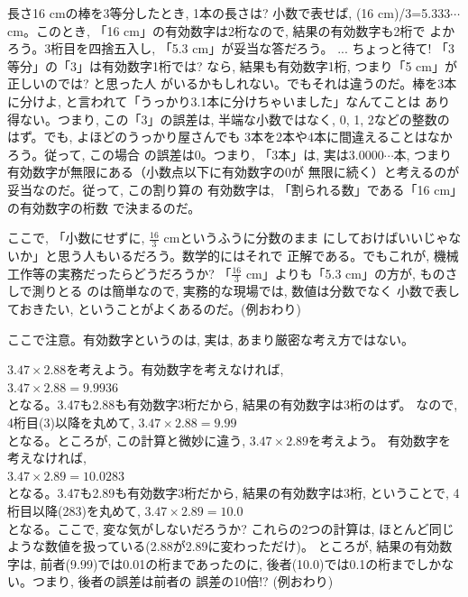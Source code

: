 \begin{exmpl} 長さ16 cmの棒を3等分したとき, 1本の長さは? 
小数で表せば, (16 cm)/3=5.333$\cdots$ cm。このとき, 
「16 cm」の有効数字は2桁なので, 結果の有効数字も2桁で
よかろう。3桁目を四捨五入し, 「5.3 cm」が妥当な答だろう。
 ... ちょっと待て! 「3等分」の「3」は有効数字1桁では? なら, 
結果も有効数字1桁, つまり「5 cm」が正しいのでは? と思った人
がいるかもしれない。でもそれは違うのだ。棒を3本に分けよ, 
と言われて「うっかり3.1本に分けちゃいました」なんてことは
あり得ない。つまり, この「3」の誤差は, 半端な小数ではなく, 
0, 1, 2などの整数のはず。でも, よほどのうっかり屋さんでも
3本を2本や4本に間違えることはなかろう。従って, この場合
の誤差は0。つまり, 「3本」は, 実は3.0000$\cdots$本, 
つまり有効数字が無限にある（小数点以下に有効数字の0が
無限に続く）と考えるのが妥当なのだ。従って, この割り算の
有効数字は, 「割られる数」である「16 cm」の有効数字の桁数
で決まるのだ。

ここで, 「小数にせずに, $\frac{16}{3}$ cmというふうに分数のまま
にしておけばいいじゃないか」と思う人もいるだろう。数学的にはそれで
正解である。でもこれが, 機械工作等の実務だったらどうだろうか? 
「$\frac{16}{3}$ cm」よりも「5.3 cm」の方が, ものさしで測りとる
のは簡単なので, 実務的な現場では, 数値は分数でなく
小数で表しておきたい, ということがよくあるのだ。(例おわり)\end{exmpl}



ここで注意。有効数字というのは, 実は, あまり厳密な考え方ではない。

\begin{exmpl} $3.47\times2.88$を考えよう。有効数字を考えなければ, \\
$3.47\times2.88=9.9936$\\
となる。3.47も2.88も有効数字3桁だから, 結果の有効数字は3桁のはず。
なので, 4桁目(3)以降を丸めて, 
$3.47\times2.88=9.99$\\
となる。ところが, この計算と微妙に違う, $3.47\times2.89$を考えよう。
有効数字を考えなければ, \\
$3.47\times2.89=10.0283$\\
となる。3.47も2.89も有効数字3桁だから, 結果の有効数字は3桁, ということで, 
4桁目以降(283)を丸めて, 
$3.47\times2.89=10.0$\\
となる。ここで, 変な気がしないだろうか? これらの2つの計算は, 
ほとんど同じような数値を扱っている(2.88が2.89に変わっただけ)。
ところが, 結果の有効数字は, 前者(9.99)では0.01の桁まであったのに, 
後者(10.0)では0.1の桁までしかない。つまり, 後者の誤差は前者の
誤差の10倍!? (例おわり)\end{exmpl}

